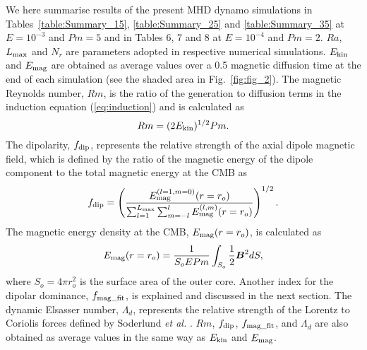 We here summarise results of the present MHD dynamo simulations in Tables~\ref{table:Summary_15}, \ref{table:Summary_25} and \ref{table:Summary_35} at $E = 10^{-3}$ and $Pm = 5$ and in  Tables 6, 7 and 8
 at $E = 10^{-4}$ and $Pm = 2$.
$Ra$, $L_{\rm max}$ and $N_r$ are parameters adopted in respective numerical simulations.
$E_{\rm kin}$ and $E_{\rm mag}$ are obtained as average values over a 0.5 magnetic diffusion time at the end of each simulation (see the shaded area in Fig.~\ref{fig:fig_2}).
The magnetic Reynolds number, $Rm$, is the ratio of the generation to diffusion terms in the induction equation (\ref{eq:induction}) and is calculated as
%
\begin{equation}
Rm = (2 E_{\rm kin})^{1/2} Pm .
\label{eq:Rm}
\end{equation}
%
The dipolarity, $f_{\rm dip}$, represents the relative strength of the axial dipole magnetic field, which is defined by the ratio of the magnetic energy of the dipole component to the total magnetic energy at the CMB as
%
%
\begin{equation}
f_{\rm dip} = 
\left(
\frac{E_{\rm mag}^{(l=1,m=0)} (r=r_o)}
     {\sum_{l=1}^{L_{\rm max}}
      \sum_{m=-l}^l E_{\rm mag}^{(l,m)} (r=r_o)}
\right)^{1/2}.
\label{eq:f_dip}
\end{equation}
%
The magnetic energy density at the CMB, $E_{\rm mag} (r=r_o)$, is calculated as
%
\begin{equation}
E_{\rm mag} (r=r_o) = 
  \frac{1}{S_o E Pm} \int_{S_o} \frac{1}{2} \mbox{\boldmath$B$}^2 dS,
\end{equation}
%
where $S_o = 4\pi r_o^2$ is the surface area of the outer core.
Another index for the dipolar dominance, $f_{\rm mag\_fit}$, is explained and discussed in the next section.
The dynamic Elsasser number, $\Lambda_d$, represents the relative strength of the Lorentz to Coriolis forces defined by Soderlund {\it et al.} .
$Rm$, $f_{\rm dip}$, $f_{\rm mag\_fit}$, and $\Lambda_d$ are also obtained as average values in the same way as $E_{\rm kin}$ and $E_{\rm mag}$.



